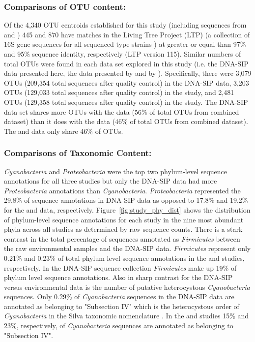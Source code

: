 \subsubsection{Comparisons of OTU content:} Of the 4,340 OTU centroids
established for this study (including sequences from \citet{Steven_2013} and
\citet{Garcia_Pichel_2013}) 445 and 870 have matches in the Living Tree
Project (LTP) (a collection of 16S gene sequences for all sequenced type
strains \citep{Yarza_2008}) at greater or equal than 97\% and 95\% sequence
identity, respectively (LTP version 115). Similar numbers of total OTUs were
found in each data set explored in this study (i.e. the DNA-SIP data
presented here, the data presented by \citet{Steven_2013} and by
\citet{Garcia_Pichel_2013}). Specifically, there were 3,079 OTUs (209,354
total sequences after quality control) in the DNA-SIP data, 3,203 OTUs
(129,033 total sequences after quality control) in the
\citet{Garcia_Pichel_2013} study, and 2,481 OTUs (129,358 total sequences
after quality control) in the \citet{Steven_2013} study. The DNA-SIP data set
shares more OTUs with the \citet{Steven_2013} data (56\% of total OTUs from
combined dataset) than it does with the \citet{Garcia_Pichel_2013} data (46\%
of total OTUs from combined dataset). The \citet{Steven_2013} and
\citet{Garcia_Pichel_2013} data only share 46\% of OTUs.

\subsubsection{Comparisons of Taxonomic Content:} \textit{Cyanobacteria} and
\textit{Proteobacteria} were the top two phylum-level sequence annotations
for all three studies but only the DNA-SIP data had more
\textit{Proteobacteria} annotations than \textit{Cyanobacteria}.
\textit{Proteobacteria} represented the 29.8\% of sequence annotations in
DNA-SIP data as opposed to 17.8\% and 19.2\% for the
\citet{Garcia_Pichel_2013} and \citet{Steven_2013} data, respectively.
Figure~\ref{fig:study_phy_dist} shows the distribution of phylum-level
sequence annotations for each study in the nine most abundant  phyla across
all studies as determined by raw sequence counts. There is a stark contrast
in the total percentage of sequences annotated as \textit{Firmicutes} between
the raw environmental samples and the DNA-SIP data. \textit{Firmicutes}
represent only 0.21\% and 0.23\% of total phylum level sequence annotations
in the \citet{Steven_2013} and \citet{Garcia_Pichel_2013} studies,
respectively. In the DNA-SIP sequence collection \textit{Firmicutes} make up
19\% of phylum level sequence annotations. Also in sharp contrast for the
DNA-SIP versus environmental data is the number of putative heterocystous
\textit{Cyanobacteria} sequences. Only 0.29\% of \textit{Cyanobacteria}
sequences in the DNA-SIP data are annotated as belonging to "Subsection IV"
which is the heterocystous order of \textit{Cyanobacteria} in the Silva
taxonomic nomenclature \citep{17947321}. In the \citet{Steven_2013} and
\citet{Garcia_Pichel_2013} studies 15\% and 23\%, respectively, of
\textit{Cyanobacteria} sequences are annotated as belonging to "Subsection
IV".  

